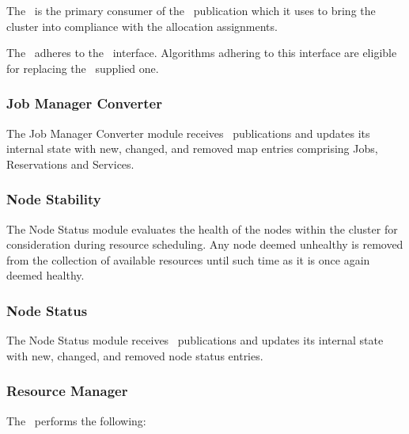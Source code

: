     The \varOrchestrator~is the primary consumer of the \varResourceManager~publication
    which it uses to bring the cluster into compliance with the allocation assignments.
    
    The \varResourceManager~adheres to the \varIScheduler~interface. 
    Algorithms adhering to this interface are eligible for replacing
    the \varDUCC~supplied one.
    
    \subsubsection{Job Manager Converter} 
    
    The Job Manager Converter module receives \varOrchestrator~publications and
    updates its internal state with new, changed, and removed map entries
    comprising Jobs, Reservations and Services.
        
    \subsubsection{Node Stability}
    
    The Node Status module evaluates the health of the nodes within the cluster
    for consideration during resource scheduling.  Any node deemed unhealthy is
    removed from the collection of available resources until such time as it
    is once again deemed healthy.
      
    \subsubsection{Node Status} 
        
    The Node Status module receives \varAgent~publications and
    updates its internal state with new, changed, and removed node status entries.
     
    \subsubsection{Resource Manager} 
    
    The \varResourceManager~performs the following:
    
